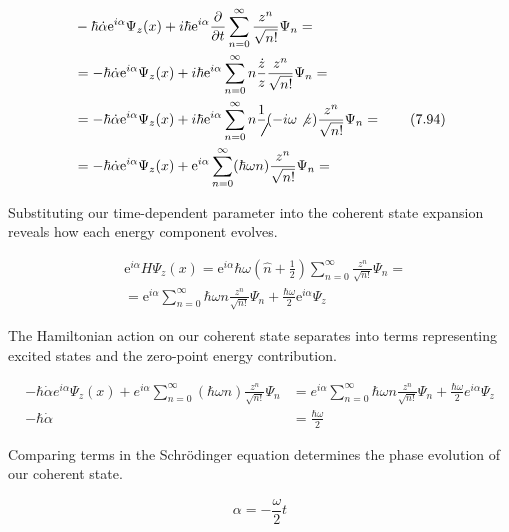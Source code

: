 \documentclass[10pt]{article}
\begin{document}
\begin{align*}
& -\hbar \dot{\alpha} \mathrm{e}^{i \alpha} \Psi_{z}(x)+i \hbar \mathrm{e}^{i \alpha} \frac{\partial}{\partial t} \sum_{n=0}^{\infty} \frac{z^{n}}{\sqrt{n!}} \Psi_{n}= \\
& =-\hbar \dot{\alpha} \mathrm{e}^{i \alpha} \Psi_{z}(x)+i \hbar \mathrm{e}^{i \alpha} \sum_{n=0}^{\infty} n \frac{\dot{z}}{z} \frac{z^{n}}{\sqrt{n!}} \Psi_{n}= \\
& =-\hbar \dot{\alpha} \mathrm{e}^{i \alpha} \Psi_{z}(x)+i \hbar \mathrm{e}^{i \alpha} \sum_{n=0}^{\infty} n \frac{1}{\not \not ~}(-i \omega \not z) \frac{z^{n}}{\sqrt{n!}} \Psi_{n}=  \tag{7.94}\\
& =-\hbar \dot{\alpha} \mathrm{e}^{i \alpha} \Psi_{z}(x)+\mathrm{e}^{i \alpha} \sum_{n=0}^{\infty}(\hbar \omega n) \frac{z^{n}}{\sqrt{n!}} \Psi_{n}=
\end{align*}

Substituting our time-dependent parameter into the coherent state expansion reveals how each energy component evolves.

\begin{align*}
& \mathrm{e}^{i \alpha} H \Psi_{z}(x)=\mathrm{e}^{i \alpha} \hbar \omega\left(\hat{n}+\frac{1}{2}\right) \sum_{n=0}^{\infty} \frac{z^{n}}{\sqrt{n!}} \Psi_{n}=  \tag{7.95}\\
& =\mathrm{e}^{i \alpha} \sum_{n=0}^{\infty} \hbar \omega n \frac{z^{n}}{\sqrt{n!}} \Psi_{n}+\frac{\hbar \omega}{2} \mathrm{e}^{i \alpha} \Psi_{z}
\end{align*}

The Hamiltonian action on our coherent state separates into terms representing excited states and the zero-point energy contribution.

\begin{align*}
-\hbar \dot{\alpha} e^{i \alpha} \Psi_{z}(x)+e^{i \alpha} \sum_{n=0}^{\infty}(\hbar \omega n) \frac{z^{n}}{\sqrt{n!}} \Psi_{n} & =e^{i \alpha} \sum_{n=0}^{\infty} \hbar \omega n \frac{z^{n}}{\sqrt{n!}} \Psi_{n}+\frac{\hbar \omega}{2} e^{i \alpha} \Psi_{z}  \tag{7.96}\\
-\hbar \dot{\alpha} & =\frac{\hbar \omega}{2}
\end{align*}

Comparing terms in the Schrödinger equation determines the phase evolution of our coherent state.

\begin{equation*}
\alpha=-\frac{\omega}{2} t \tag{7.97}
\end{equation*}
\end{document}

